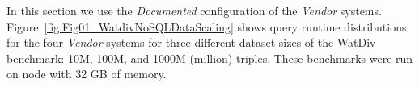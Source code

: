 %
%
In this section we use the \emph{Documented} configuration of the \emph{Vendor} systems.
Figure~\ref{fig:Fig01_WatdivNoSQLDataScaling} shows query runtime distributions for the four \emph{Vendor} systems for three different dataset sizes of the WatDiv benchmark: 10M, 100M, and 1000M (million) triples. These benchmarks were run on node with 32 GB of memory.
%
%
%  

